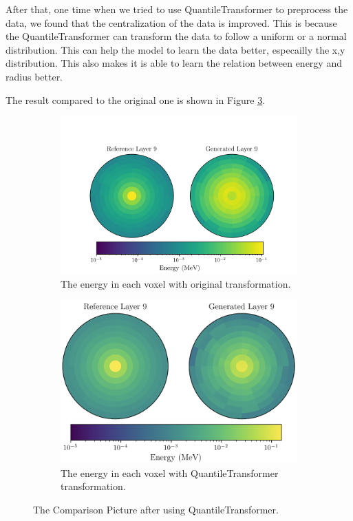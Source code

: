After that, one time when we tried to use QuantileTransformer to preprocess the data, we found that the centralization of the data is improved. This is because the QuantileTransformer can transform the data to follow a uniform or a normal distribution. This can help the model to learn the data better, especailly the x,y distribution. This also makes it is able to learn the relation between energy and radius better.

The result compared to the original one is shown in Figure \ref{fig:centralization}.

\begin{figure}[htbp]
    \centering
    \begin{subfigure}[b]{0.45\textwidth} %
        \includegraphics[width=\textwidth]{Figures/comparison_original.png}
        \caption{The energy in each voxel with original transformation.}
        \label{fig:original}
    \end{subfigure}
    \hfill %
    \begin{subfigure}[b]{0.45\textwidth}
        \includegraphics[width=\textwidth]{Figures/comparison.png}
        \caption{The energy in each voxel with QuantileTransformer transformation.}
        \label{fig:quantile}
    \end{subfigure}
    
    \caption{The Comparison Picture after using QuantileTransformer.}
    \label{fig:centralization}
\end{figure}

